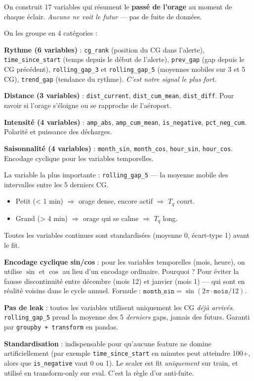 \documentclass[11pt,a4paper]{article}
\begin{document}
\begin{dire}
\og On construit 17 variables qui résument le \textbf{passé de l'orage} au moment de
chaque éclair. \emph{Aucune ne voit le futur} — pas de fuite de données.

On les groupe en 4 catégories :

\textbf{Rythme (6 variables)} : \texttt{cg\_rank} (position du CG dans l'alerte),
\texttt{time\_since\_start} (temps depuis le début de l'alerte), \texttt{prev\_gap}
(gap depuis le CG précédent), \texttt{rolling\_gap\_3} et \texttt{rolling\_gap\_5}
(moyennes mobiles sur 3 et 5 CG), \texttt{trend\_gap} (tendance du rythme). \emph{C'est
notre signal le plus fort}.

\textbf{Distance (3 variables)} : \texttt{dist\_current}, \texttt{dist\_cum\_mean},
\texttt{dist\_diff}. Pour savoir si l'orage s'éloigne ou se rapproche de l'aéroport.

\textbf{Intensité (4 variables)} : \texttt{amp\_abs}, \texttt{amp\_cum\_mean},
\texttt{is\_negative}, \texttt{pct\_neg\_cum}. Polarité et puissance des décharges.

\textbf{Saisonnalité (4 variables)} : \texttt{month\_sin}, \texttt{month\_cos},
\texttt{hour\_sin}, \texttt{hour\_cos}. Encodage cyclique pour les variables temporelles.

La variable la plus importante : \texttt{rolling\_gap\_5} — la moyenne mobile des
intervalles entre les 5 derniers CG.
\begin{itemize}[topsep=2pt]
    \item Petit (< 1 min) $\Rightarrow$ orage dense, encore actif $\Rightarrow$ $T_q$ court.
    \item Grand (> 4 min) $\Rightarrow$ orage qui se calme $\Rightarrow$ $T_q$ long.
\end{itemize}

Toutes les variables continues sont standardisées (moyenne 0, écart-type 1) avant le fit. \fg{}
\end{dire}

\begin{compr}
\textbf{Encodage cyclique sin/cos} : pour les variables temporelles (mois, heure), on
utilise $\sin$ et $\cos$ au lieu d'un encodage ordinaire. Pourquoi ? Pour éviter la
fausse discontinuité entre décembre (mois 12) et janvier (mois 1) — qui sont en réalité
voisins dans le cycle annuel. Formule : $\texttt{month\_sin} = \sin(2\pi \cdot \texttt{mois}/12)$.

\textbf{Pas de leak} : toutes les variables utilisent uniquement les CG \emph{déjà arrivés}.
\texttt{rolling\_gap\_5} prend la moyenne des 5 \emph{derniers} gaps, jamais des futurs.
Garanti par \texttt{groupby + transform} en pandas.

\textbf{Standardisation} : indispensable pour qu'aucune feature ne domine artificiellement
(par exemple \texttt{time\_since\_start} en minutes peut atteindre 100+, alors que
\texttt{is\_negative} vaut 0 ou 1). Le scaler est fit \emph{uniquement} sur train, et
utilisé en \og transform-only \fg{} sur eval. C'est la règle d'or anti-fuite.
\end{compr}
\end{document}
